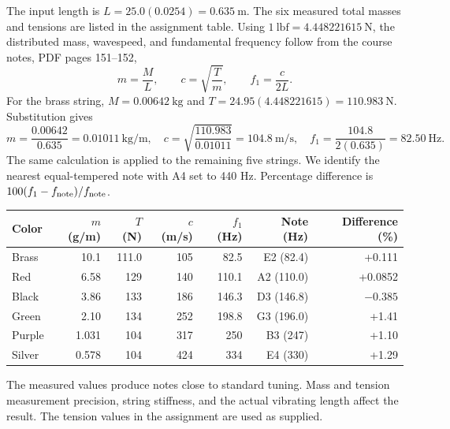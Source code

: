 The input length is \(L=25.0(0.0254)=0.635\ \mathrm{m}\). The six measured total masses and tensions are listed in the assignment table. Using \(1\ \mathrm{lbf}=4.448221615\ \mathrm{N}\), the distributed mass, wavespeed, and fundamental frequency follow from the course notes, PDF pages 151--152,
\[
m=\frac{M}{L},\qquad c=\sqrt{\frac{T}{m}},\qquad f_1=\frac{c}{2L}.
\]
For the brass string, $M=0.00642\ \mathrm{kg}$ and $T=24.95(4.448221615)=110.983\ \mathrm{N}$. Substitution gives
\[
m=\frac{0.00642}{0.635}=0.01011\ \mathrm{kg/m},\quad
c=\sqrt{\frac{110.983}{0.01011}}=104.8\ \mathrm{m/s},\quad
f_1=\frac{104.8}{2(0.635)}=82.50\ \mathrm{Hz}.
\]
The same calculation is applied to the remaining five strings. We identify the nearest equal-tempered note with A4 set to 440 Hz. Percentage difference is \(100(f_1-f_{\rm note})/f_{\rm note}\).
\begin{center}\small
\begin{tabular}{lrrrrrr}\toprule
Color & \(m\) (g/m) & \(T\) (N) & \(c\) (m/s) & \(f_1\) (Hz) & Note (Hz) & Difference (\%)\\\midrule
Brass & 10.1 & 111.0 & 105 & 82.5 & E2 (82.4) & +0.111\\
Red & 6.58 & 129 & 140 & 110.1 & A2 (110.0) & +0.0852\\
Black & 3.86 & 133 & 186 & 146.3 & D3 (146.8) & $-0.385$\\
Green & 2.10 & 134 & 252 & 198.8 & G3 (196.0) & +1.41\\
Purple & 1.031 & 104 & 317 & 250 & B3 (247) & +1.10\\
Silver & 0.578 & 104 & 424 & 334 & E4 (330) & +1.29\\\bottomrule
\end{tabular}\end{center}
The measured values produce notes close to standard tuning. Mass and tension measurement precision, string stiffness, and the actual vibrating length affect the result. The tension values in the assignment are used as supplied.

